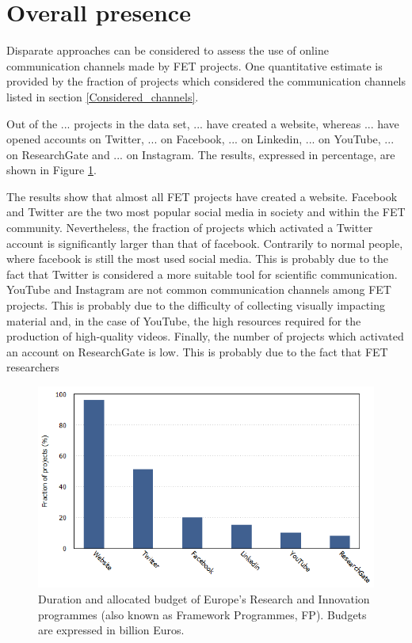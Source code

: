 \section{Overall presence}
Disparate approaches can be considered to assess the use of online communication channels made by FET projects. One quantitative estimate is provided by the fraction of projects which considered the communication channels listed in section \ref{Considered_channels}. 

Out of the ... projects in the data set, ... have created a website, whereas ... have opened accounts on Twitter, ... on Facebook, ... on  Linkedin, ... on YouTube, ... on ResearchGate and ... on Instagram. The results, expressed in percentage, are shown in Figure \ref{Social_media}.

The results show that almost all FET projects have created a website. Facebook and Twitter are the two most popular social media in society and within the FET community. Nevertheless, the fraction of projects which activated a Twitter account is significantly larger than that of facebook. Contrarily to normal people, where facebook is still the most used social media. This is probably due to the fact that Twitter is considered a more suitable tool for scientific communication. YouTube and Instagram are not common communication channels among FET projects. This is probably due to the difficulty of collecting visually impacting material and, in the case of YouTube, the high resources required for the production of high-quality videos. Finally, the number of projects which activated an account on ResearchGate is low. This is probably due to the fact that FET researchers 

\begin{figure}[!t] 
 \begin{center}
 \includegraphics[scale=0.4]{Images/Social_media.png}
 \caption{Duration and allocated budget of Europe's Research and Innovation programmes (also known as Framework Programmes, FP). Budgets are expressed in billion Euros.}
 \label{Social_media}
 \end{center}
\end{figure}

